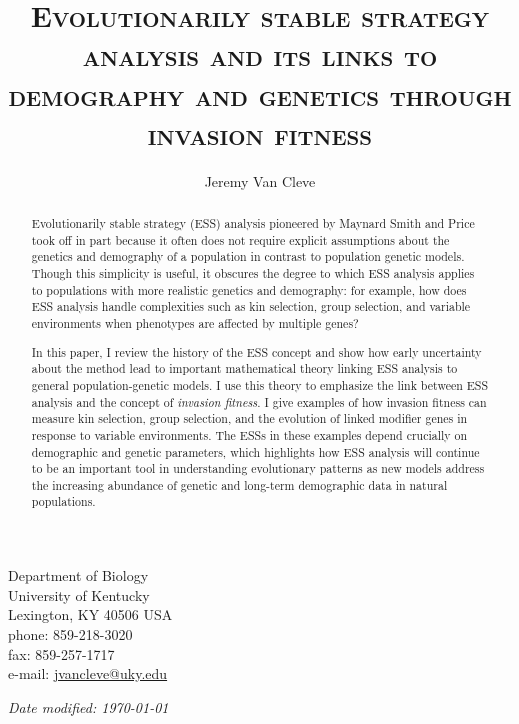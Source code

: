 \documentclass[11pt]{article}
\begin{document}
\begin{titlingpage}
\setlength{\droptitle}{2em}
\pretitle{\begin{center}\LARGE}
\posttitle{\par\end{center}\vskip 2.5em}

\title{\scshape Evolutionarily stable strategy analysis and its links to demography and genetics through invasion fitness}
\author{Jeremy Van Cleve}
\date{}
\maketitle

\vfill

\noindent
Department of Biology\\
University of Kentucky\\
Lexington, KY 40506 USA\\[1em]
phone: 859-218-3020\\
fax: 859-257-1717\\[1em]
e-mail: \href{mailto:jvancleve@uky.edu}{jvancleve@uky.edu}

\vspace{2em}

\begin{flushright} \textit{Date modified: \today} \end{flushright}
\end{titlingpage}

\linenumbers
\onehalfspacing
\begin{abstract}

  Evolutionarily stable strategy (ESS) analysis pioneered by Maynard Smith and Price took off in part because it often does not require explicit assumptions about the genetics and demography of a population in contrast to population genetic models. Though this simplicity is useful, it obscures the degree to which ESS analysis applies to populations with more realistic genetics and demography: for example, how does ESS analysis handle complexities such as kin selection, group selection, and variable environments when phenotypes are affected by multiple genes?

  In this paper, I review the history of the ESS concept and show how early uncertainty about the method lead to important mathematical theory linking ESS analysis to general population-genetic models. I use this theory to emphasize the link between ESS analysis and the concept of \textit{invasion fitness}. I give examples of how invasion fitness can measure kin selection, group selection, and the evolution of linked modifier genes in response to variable environments. The ESSs in these examples depend crucially on demographic and genetic parameters, which highlights how ESS analysis will continue to be an important tool in understanding evolutionary patterns as new models address the increasing abundance of genetic and long-term demographic data in natural populations.

\end{abstract}
\end{document}
